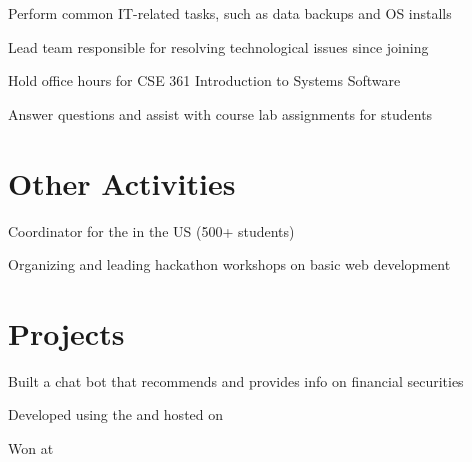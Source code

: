 \documentclass[]{deedy-resume-openfont}
\begin{document}
\begin{minipage}[t]{0.66\textwidth}
\begin{tightemize}
\item Perform common IT-related tasks, such as data backups and OS installs
\item Lead team responsible for resolving  technological issues since joining
\end{tightemize}
\sectionsep

\begin{tightemize}
\item Hold office hours for CSE 361 Introduction to Systems Software
\item Answer questions and assist with course lab assignments for  students
\end{tightemize}
\sectionsep


\section{Other Activities}

\begin{tightemize}
\item Coordinator for the  in the US (500+ students)
\item Organizing and leading hackathon workshops on basic web development
\end{tightemize}
\sectionsep


\section{Projects}
\descript{}
\begin{tightemize}
\item Built a chat bot that recommends and provides info on financial securities
\item Developed using the  and hosted on 
\item Won  at 
\end{tightemize}
\sectionsep


\end{minipage}
\end{document}
